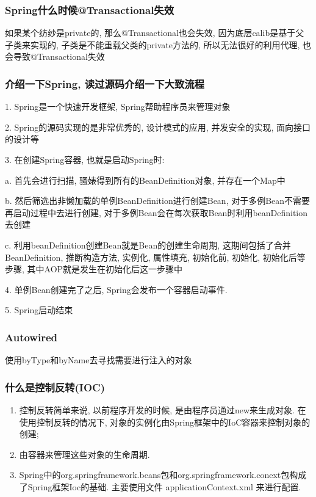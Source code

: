 \documentclass[UTF8]{ctexart}
\begin{document}
\subsubsection{Spring什么时候@Transactional失效}
如果某个纺纱是private的, 那么@Transactional也会失效, 因为底层calib是基于父子类来实现的, 子类是不能重载父类的private方法的, 所以无法很好的利用代理, 也会导致@Transactional失效 \par
\subsubsection{介绍一下Spring, 读过源码介绍一下大致流程}
1. Spring是一个快速开发框架, Spring帮助程序员来管理对象 \par
2. Spring的源码实现的是非常优秀的, 设计模式的应用, 并发安全的实现, 面向接口的设计等 \par
3. 在创建Spring容器, 也就是启动Spring时: \par
a. 首先会进行扫描, 骚婊得到所有的BeanDefinition对象, 并存在一个Map中 \par
b. 然后筛选出非懒加载的单例BeanDefinition进行创建Bean, 对于多例Bean不需要再启动过程中去进行创建, 对于多例Bean会在每次获取Bean时利用beanDefinition去创建 \par
c. 利用beanDefinition创建Bean就是Bean的创建生命周期, 这期间包括了合并BeanDefinition, 推断构造方法, 实例化, 属性填充, 初始化前, 初始化, 初始化后等步骤, 其中AOP就是发生在初始化后这一步骤中\par
4. 单例Bean创建完了之后, Spring会发布一个容器启动事件. \par
5. Spring启动结束 \par

\subsubsection{Autowired}
使用byType和byName去寻找需要进行注入的对象
	\subsubsection{什么是控制反转(IOC)}
	\begin{enumerate}
		\item 
		控制反转简单来说, 以前程序开发的时候, 是由程序员通过new来生成对象. 在使用控制反转的情况下, 对象的实例化由Spring框架中的IoC容器来控制对象的创建; 
		\item 由容器来管理这些对象的生命周期.
		\item Spring中的org.springframework.beans包和org.springframework.conext包构成了Spring框架Ioc的基础. 主要使用文件 applicationContext.xml 来进行配置.
	\end{enumerate}
\end{document}

